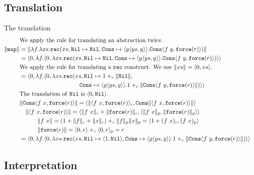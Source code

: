 \subsection{Translation}
The translation
\begin{align*}
  &\text{We apply the rule for translating an abstraction twice.}\\
  \|\T{map}\| &= \|\lambda f. \lambda xs . \T{rec}(xs, \T{Nil} \mapsto \T{Nil}, \T{Cons} \mapsto \langle y \langle ys, y \rangle\rangle. \T{Cons}\langle f\ y, \T{force}(r)\rangle)\| \\
              &= \langle 0, \lambda f. \langle 0, \lambda xs . \T{rec}(xs, \T{Nil} \mapsto \T{Nil}, \T{Cons} \mapsto \langle y \langle ys, y \rangle\rangle. \T{Cons}\langle f\ y, \T{force}(r)\rangle)\rangle\rangle \\
              &\text{We apply the rule for translating a \T{rec} construct. We use $\|xs\| = \langle 0,xs\rangle$.}\\
              &= \langle 0, \lambda f. \langle 0, \lambda xs .\T{rec}(xs, \T{Nil} \mapsto 1 +_c \|\T{Nil}\|, \\
              &\quadten \T{Cons} \mapsto \langle y \langle ys, y \rangle\rangle.1 +_c \|\T{Cons}\langle f\ y, \T{force}(r)\rangle\|)\rangle\rangle \\
              &\text{The translation of \T{Nil} is $\langle 0, \T{Nil}\rangle$.}\\
              &\|\T{Cons}\langle f\ x,\T{force}(r)\rangle\| = \langle \|\langle f\ x,\T{force}(r)\rangle_c, \T{Cons}\|\langle f\ x,\T{force}(r)\rangle\|\rangle \\
              &\quad \|\langle f\ x,\T{force}(r)\rangle\| = \langle\|f\ x\|_c + \|\T{force}(r)\|_c, \langle \|f\ x\|_p,\|\T{force}(r)\|_p\rangle\rangle \\
              &\quadthree \|f\ x\| = (1 + \|f\|_c + \|x\|_c) +_c \|f\|_p\|x\|_p = \langle 1 + (f\ x)_c, (f\ x)_p\rangle \\
              &\quadthree \|\T{force}(r)\| = \langle 0,r\rangle +_c \langle 0,r\rangle_p = r \\
              &= \langle 0, \lambda f. \langle 0, \lambda xs . \T{rec}(xs, \T{Nil} \mapsto \langle 1,\T{Nil}\rangle, \T{Cons} \mapsto \langle y \langle ys, y \rangle\rangle.1 +_c \|\T{Cons}\langle f\ y, \T{force}(r)\rangle\|)\rangle\rangle \\
\end{align*}

\subsection{Interpretation}
